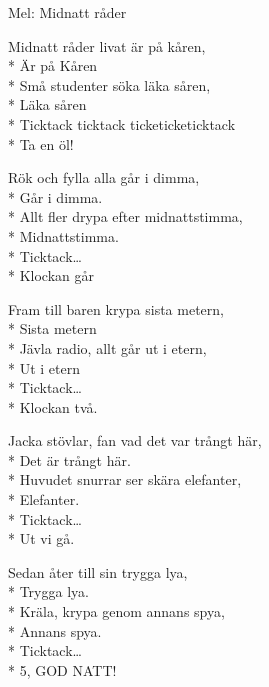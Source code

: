 \begin{SongText}
    \begin{SongInfo}
        Mel: Midnatt råder
    \end{SongInfo}
    \begin{SongVerse}
        Midnatt råder livat är på kåren,\\*%
        Är på Kåren\\*%
        Små studenter söka läka såren,\\*%
        Läka såren\\*%
        Ticktack ticktack ticketicketicktack\\*%
        Ta en öl!
    \end{SongVerse}
    \begin{SongVerse}
        Rök och fylla alla går i dimma,\\*%
        Går i dimma.\\*%
        Allt fler drypa efter midnattstimma,\\*%
        Midnattstimma.\\*%
        Ticktack…\\*%
        Klockan går
    \end{SongVerse}
    \begin{SongVerse}
        Fram till baren krypa sista metern,\\*%
        Sista metern\\*%
        Jävla radio, allt går ut i etern,\\*%
        Ut i etern\\*%
        Ticktack…\\*%
        Klockan två.
    \end{SongVerse}
    \begin{SongVerse}
        Jacka stövlar, fan vad det var trångt här,\\*%
        Det är trångt här.\\*%
        Huvudet snurrar ser skära elefanter,\\*%
        Elefanter.\\*%
        Ticktack…\\*%
        Ut vi gå.
    \end{SongVerse}
    \begin{SongVerse}
        Sedan åter till sin trygga lya,\\*%
        Trygga lya.\\*%
        Kräla, krypa genom annans spya,\\*%
        Annans spya.\\*%
        Ticktack…\\*%
        5, GOD NATT!
    \end{SongVerse}
\end{SongText}
